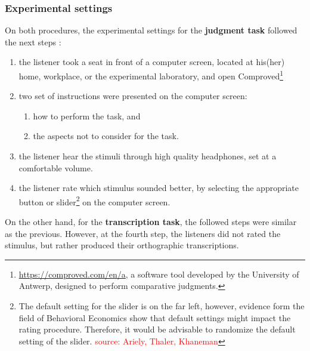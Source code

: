 \subsubsection{Experimental settings} \label{ss_sect:expset}
%
On both procedures, the experimental settings for the \textbf{judgment task} followed the next steps \citep{Boonen_et_al_2020, Boonen_et_al_2021}:
%
\begin{enumerate}
	\item the listener took a seat in front of a computer screen, located at his(her) home, workplace, or the experimental laboratory, and open Comproved\footnote{\url{https://comproved.com/en/a}, a software tool developed by the University of Antwerp, designed to perform comparative judgments.}
	\item two set of instructions were presented on the computer screen:
	\begin{enumerate}
		\item how to perform the task, and
		\item the aspects not to consider for the task.
	\end{enumerate}
	\item the listener hear the stimuli through high quality headphones, set at a comfortable volume.
	\item the listener rate which stimulus sounded better, by selecting the appropriate button or slider\footnote{The default setting for the slider is on the far left, however, evidence form the field of Behavioral Economics show that default settings might impact the rating procedure. Therefore, it would be advisable to randomize the default setting of the slider. \textcolor{red}{source: Ariely, Thaler, Khaneman}} on the computer screen.
\end{enumerate}
%
On the other hand, for the \textbf{transcription task}, the followed steps were similar as the previous. However, at the fourth step, the listeners did not rated the stimulus, but rather produced their orthographic transcriptions.
%
%
